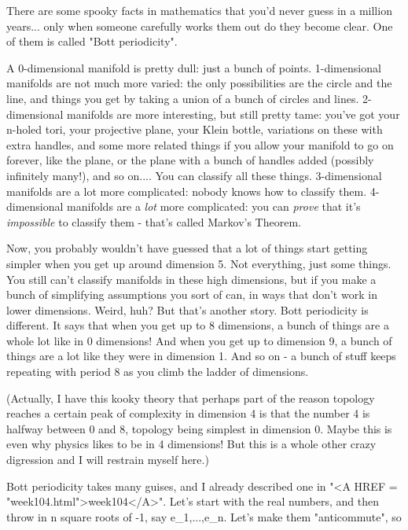 


There are some spooky facts in mathematics that you'd never guess in a
million years... only when someone carefully works them out do they
become clear.  One of them is called "Bott periodicity".  

A 0-dimensional manifold is pretty dull: just a bunch of points.
1-dimensional manifolds are not much more varied: the only
possibilities are the circle and the line, and things you get by
taking a union of a bunch of circles and lines.  2-dimensional
manifolds are more interesting, but still pretty tame: you've got your
n-holed tori, your projective plane, your Klein bottle, variations on
these with extra handles, and some more related things if you allow
your manifold to go on forever, like the plane, or the plane with a
bunch of handles added (possibly infinitely many!), and so on....  You
can classify all these things.  3-dimensional manifolds are a lot
more complicated: nobody knows how to classify them.  4-dimensional
manifolds are a \emph{lot} more complicated: you can \emph{prove}
that it's \emph{impossible} to classify them - that's called Markov's Theorem.  

Now, you probably wouldn't have guessed that a lot of things start
getting simpler when you get up around dimension 5.  Not everything,
just some things.  You still can't classify manifolds in these high
dimensions, but if you make a bunch of simplifying assumptions you
sort of can, in ways that don't work in lower dimensions.  Weird, huh?
But that's another story.  Bott periodicity is different.  It says
that when you get up to 8 dimensions, a bunch of things are a whole
lot like in 0 dimensions!  And when you get up to dimension 9, a bunch
of things are a lot like they were in dimension 1.  And so on - a
bunch of stuff keeps repeating with period 8 as you climb the ladder
of dimensions.

(Actually, I have this kooky theory that perhaps part of the reason
topology reaches a certain peak of complexity in dimension 4 is that
the number 4 is halfway between 0 and 8, topology being simplest in
dimension 0.  Maybe this is even why physics likes to be in 4
dimensions!  But this is a whole other crazy digression and I will
restrain myself here.)

Bott periodicity takes many guises, and I already described one in
"<A HREF = "week104.html">week104</A>".  Let's start with the real numbers, and then throw in n
square roots of -1, say e_{1},...,e_{n}.   Let's make them "anticommute",
so

